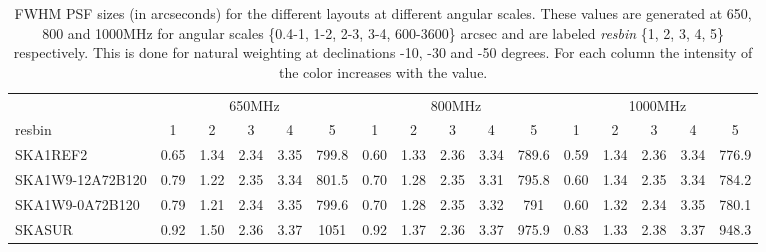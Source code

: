 \begin{table}[!htp]
{{\begin{tabular}{|lccccc||ccccc||ccccc|}
 \tabularnewline \cline{2-16} \multicolumn{1}{c}{ } & \multicolumn{5}{|c}{650MHz}  & \multicolumn{5}{c}{800MHz}  & \multicolumn{5}{c|}{1000MHz} \tabularnewline \cline{1-16} 
 resbin  &1 & 2 & 3 & 4 & 5 & 1 & 2 & 3 & 4 & 5 & 1 & 2 & 3 & 4 & 5 \tabularnewline \hline
SKA1REF2 & 0.65 \cellcolor{blue!18.00} & 1.34 \cellcolor{red!36.79} & 2.34 \cellcolor{green!18.00} & 3.35 \cellcolor{orange!33.35} & 799.8 \cellcolor{purple!18.03} & 0.60 \cellcolor{blue!18.00} & 1.33 \cellcolor{red!39.49} & 2.36 \cellcolor{green!57.35} & 3.34 \cellcolor{orange!42.20} & 789.6 \cellcolor{purple!18.00} & 0.59 \cellcolor{blue!18.00} & 1.34 \cellcolor{red!60.00} & 2.36 \cellcolor{green!37.12} & 3.34 \cellcolor{orange!18.00} & 776.9 \cellcolor{purple!18.00}\\ \hline 
SKA1W9-12A72B120 & 0.79 \cellcolor{blue!39.20} & 1.22 \cellcolor{red!19.82} & 2.35 \cellcolor{green!41.82} & 3.34 \cellcolor{orange!18.00} & 801.5 \cellcolor{purple!18.32} & 0.70 \cellcolor{blue!31.17} & 1.28 \cellcolor{red!19.28} & 2.35 \cellcolor{green!18.00} & 3.31 \cellcolor{orange!18.00} & 795.8 \cellcolor{purple!19.40} & 0.60 \cellcolor{blue!19.91} & 1.34 \cellcolor{red!51.29} & 2.35 \cellcolor{green!27.45} & 3.34 \cellcolor{orange!18.46} & 784.2 \cellcolor{purple!19.79}\\ \hline 
SKA1W9-0A72B120 & 0.79 \cellcolor{blue!39.86} & 1.21 \cellcolor{red!18.00} & 2.34 \cellcolor{green!19.23} & 3.35 \cellcolor{orange!35.72} & 799.6 \cellcolor{purple!18.00} & 0.70 \cellcolor{blue!31.38} & 1.28 \cellcolor{red!18.00} & 2.35 \cellcolor{green!31.89} & 3.32 \cellcolor{orange!21.28} & 791 \cellcolor{purple!18.32} & 0.60 \cellcolor{blue!19.52} & 1.32 \cellcolor{red!18.00} & 2.34 \cellcolor{green!18.00} & 3.35 \cellcolor{orange!35.79} & 780.1 \cellcolor{purple!18.78}\\ \hline 
SKASUR & 0.92 \cellcolor{blue!60.00} & 1.50 \cellcolor{red!60.00} & 2.36 \cellcolor{green!60.00} & 3.37 \cellcolor{orange!60.00} & 1051 \cellcolor{purple!60.00} & 0.92 \cellcolor{blue!60.00} & 1.37 \cellcolor{red!60.00} & 2.36 \cellcolor{green!60.00} & 3.37 \cellcolor{orange!60.00} & 975.9 \cellcolor{purple!60.00} & 0.83 \cellcolor{blue!60.00} & 1.33 \cellcolor{red!46.43} & 2.38 \cellcolor{green!60.00} & 3.37 \cellcolor{orange!60.00} & 948.3 \cellcolor{purple!60.00}\tabularnewline \hline 
\end{tabular}}\hfil 

\caption{FWHM PSF sizes (in arcseconds) for the different layouts at different angular scales. These values are generated at 650, 800 and 1000MHz for angular scales \{0.4-1, 1-2, 2-3, 3-4, 600-3600\} arcsec and are labeled {\it resbin} \{1, 2, 3, 4, 5\} respectively. This is done for natural weighting at declinations -10, -30 and -50 degrees. For each column the intensity of the color increases with the value.}\label{tab:psf_mean-band1}}
 \end{table}